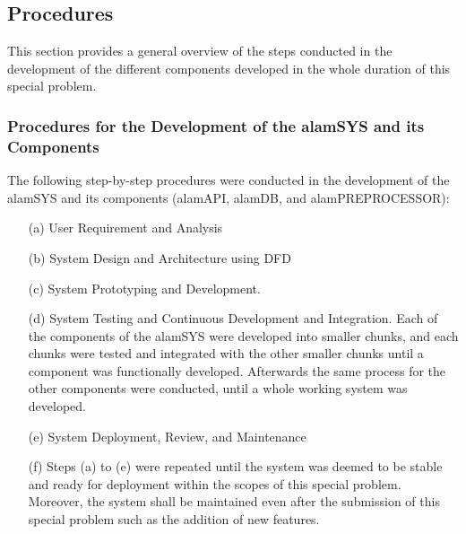 \subsection{Procedures}
\label{subsec:procedures}
This section provides a general overview of the steps conducted
in the development of the different components developed in the
whole duration of this special problem.

\subsubsection{Procedures for the Development of the alamSYS and its Components}
\label{subsubsec:proc_alamSYS}
The following step-by-step procedures were conducted in the development
of the alamSYS and its components (alamAPI, alamDB, and alamPREPROCESSOR):
\begin{itemize}
    \item[(a)] User Requirement and Analysis
    \item[(b)] System Design and Architecture using DFD
    \item[(c)] System Prototyping and Development.
    \item[(d)] System Testing and Continuous Development and Integration.
    Each of the components of the alamSYS were developed into smaller chunks,
    and each chunks were tested and integrated with the other smaller chunks
    until a component was functionally developed. Afterwards the same process for
    the other components were conducted, until a whole working system was developed.
    \item[(e)] System Deployment, Review, and Maintenance
    \item[(f)] Steps (a) to (e) were repeated until the system was deemed
    to be stable and ready for deployment within the scopes of this special
    problem. Moreover, the system shall be maintained even after the submission
    of this special problem such as the addition of new features.
\end{itemize}

